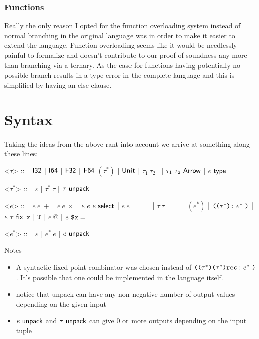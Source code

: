 \documentclass{article}
\begin{document}
\subsubsection{Functions}
Really the only reason I opted for the function overloading system instead of normal branching in the original language was in order to make it easier to extend the language.
Function overloading seems like it would be needlessly painful to formalize and doesn't contribute to our proof of soundness any more than branching via a ternary. As the case for functions having potentially no possible branch results in a type error in the complete language and this is simplified by having an else clause.

\section{Syntax}
Taking the ideas from the above rant into account we arrive at something along these lines:

\renewcommand{\grammarlabel}[2]{#1 \hfill#2}
\begin{grammar}
    <$\tau$> ::= $\mathsf{I32}$
    |    $\mathsf{I64}$
    |    $\mathsf{F32}$
    |    $\mathsf{F64}$
    \alt $(\tau^*)$
    |    $\mathsf{Unit}$
    |    $\tau_1~ \tau_2~ \texttt{|}$
    |    $\tau_1 ~ \tau_2 ~ \mathsf{Arrow}$
    |    $e ~ \mathsf{type}$
        
    <$\tau^*$> ::= $\varepsilon$ | $\tau^* ~ \tau$ | $\tau ~ \mathsf{unpack}$

    <$e$> ::= $e~ e~ +$
    |    $e~ e~ \times$
    |    $e ~ e ~ e ~ \mathsf{select} $
    |    $e~ e~ ==$
    |    $\tau~ \tau~ ==$
    \alt $(e^*)$
    |    $\texttt{((} \tau^* \texttt{):} ~ e^* ~ \texttt{)}$
    |    $e ~ \tau ~ \mathsf{fix}$
    \alt $\texttt{x}$
    |    $\texttt{T}$
    |    $e~ \textbf{@} $
    |    $e~ \texttt{\$x} =$

    <$e^*$> ::= $\varepsilon$ | $e^* ~ e$ | $e ~ \mathsf{unpack}$
\end{grammar}

Notes
\begin{itemize}
    \item A syntactic fixed point combinator was chosen instead of $\texttt{((} \tau^* \texttt{)(} \tau^* \texttt{)rec:} ~ e^* ~ \texttt{)}$. It's possible that one could be implemented in the language itself.
    \item notice that unpack can have any non-negative number of output values depending on the given input
    \item $e ~ \mathsf{unpack}$ and $\tau ~ \mathsf{unpack}$ can give 0 or more outputs depending on the input tuple
\end{itemize}
\end{document}

